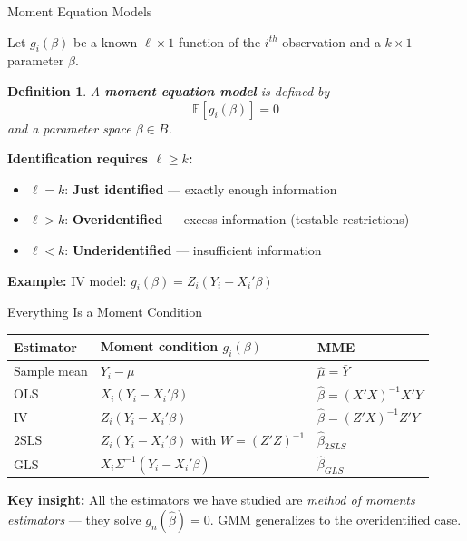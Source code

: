 \documentclass[aspectratio=169, handout, t]{beamer}
\newtheorem{defn}{Definition}
\numberwithin{equation}{section}
\begin{document}
\begin{frame}{Moment Equation Models}

Let $g_i(\beta)$ be a known $\ell \times 1$ function of the $i^{th}$ observation and a $k \times 1$ parameter $\beta$.

\begin{defn}
A \textbf{moment equation model} is defined by
$$\mathbb{E}[g_i(\beta)] = 0$$
and a parameter space $\beta \in B$.
\end{defn}

\medskip
\textbf{Identification requires $\ell \geq k$:}
\begin{itemize}
\item $\ell = k$: \textbf{Just identified} --- exactly enough information
\item $\ell > k$: \textbf{Overidentified} --- excess information (testable restrictions)
\item $\ell < k$: \textbf{Underidentified} --- insufficient information
\end{itemize}

\smallskip
\textbf{Example:} IV model: $g_i(\beta) = Z_i(Y_i - X_i'\beta)$

\end{frame}

\begin{frame}{Everything Is a Moment Condition}

\begin{table}[h]
\centering
\small
\begin{tabular}{lll}
\toprule
\textbf{Estimator} & \textbf{Moment condition $g_i(\beta)$} & \textbf{MME} \\
\midrule
Sample mean & $Y_i - \mu$ & $\hat\mu = \bar{Y}$ \\[4pt]
OLS & $X_i(Y_i - X_i'\beta)$ & $\hat\beta = (X'X)^{-1}X'Y$ \\[4pt]
IV & $Z_i(Y_i - X_i'\beta)$ & $\hat\beta = (Z'X)^{-1}Z'Y$ \\[4pt]
2SLS & $Z_i(Y_i - X_i'\beta)$ with $W=(Z'Z)^{-1}$ & $\hat\beta_{2SLS}$ \\[4pt]
GLS & $\bar X_i\Sigma^{-1}(Y_i - \bar X_i'\beta)$ & $\hat\beta_{GLS}$ \\
\bottomrule
\end{tabular}
\end{table}

\medskip
\begin{tcolorbox}[colback=blue!5, colframe=blue!50]
\textbf{Key insight:} All the estimators we have studied are \textit{method of moments estimators} --- they solve $\bar{g}_n(\hat\beta) = 0$. GMM generalizes to the overidentified case.
\end{tcolorbox}

\end{frame}
\end{document}
